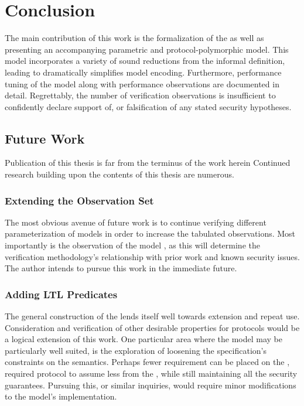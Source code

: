 \hypertarget{sec:conclusion}{%
\chapter{Conclusion}\label{sec:conclusion}}

The main contribution of this work is the formalization of the \CGKAsec as well as presenting an accompanying parametric and protocol-polymorphic  model.
This \CGKAmod{}{}{} model incorporates a variety of sound reductions from the informal \CGKAsec definition, leading to dramatically simplifies model encoding.
Furthermore, performance tuning of the model along with performance observations are documented in detail.
Regrettably, the number of verification observations is insufficient to confidently declare support of, or falsification of any stated security hypotheses.


\hypertarget{sec:future-work}{%
\section{Future Work}\label{sec:future-work}}

Publication of this thesis is far from the terminus of the work herein
Continued research building upon the contents of this thesis are numerous.


\hypertarget{sec:more-observations}{%
\subsection{Extending the Observation Set}\label{sec:more-observations}}

The most obvious avenue of future work is to continue verifying different parameterization of  models in order to increase the tabulated observations.
Most importantly is the observation of the model , as this will determine the verification methodology's relationship with prior work and known security issues.
The author intends to pursue this work in the immediate future.


\hypertarget{sec:more-predicates}{%
\subsection{Adding LTL Predicates}\label{sec:more-predicates}}

The general construction of the  lends itself well towards extension and repeat use.
Consideration and verification of other desirable properties for \CGKAdef protocols would be a logical extension of this work.
One particular area where the  model may be particularly well suited, is the exploration of loosening the  specification's constraints on the  semantics.
Perhaps fewer requirement can be placed on the , required protocol to assume less from the , while still maintaining all the  security guarantees.
Pursuing this, or similar inquiries, would require minor modifications to the  model's implementation.


